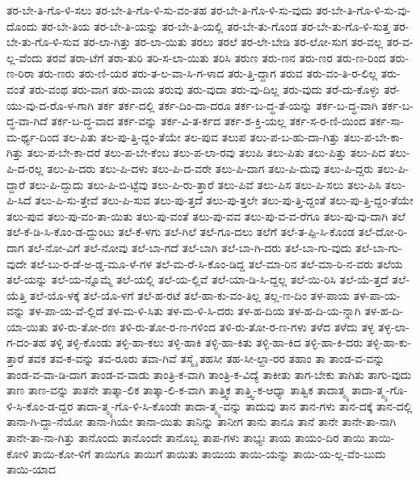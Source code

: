 {ತರ-ಬೇ-ತಿ-ಗೊ-ಳಿ-ಸಲು
ತರ-ಬೇ-ತಿ-ಗೊ-ಳಿ-ಸು-ವಂ-ತಹ
ತರ-ಬೇ-ತಿ-ಗೊ-ಳಿ-ಸು-ವುದು
ತರ-ಬೇ-ತಿ-ಗೊ-ಳಿ-ಸು-ವು-ದೊಂದು
ತರ-ಬೇ-ತಿಯ
ತರ-ಬೇ-ತಿ-ಯನ್ನು
ತರ-ಬೇ-ತಿ-ಯಲ್ಲಿ
ತರ-ಬೇ-ತು-ಗೊಂಡ
ತರ-ಬೇ-ತು-ಗೊ-ಳಿ-ಸುತ್ತ
ತರ-ಬೇ-ತು-ಗೊ-ಳಿ-ಸುವ
ತರ-ಲಾ-ಗಿತ್ತು
ತರ-ಲಾ-ಯಿತು
ತರಲು
ತರಲೆ
ತರ-ಲೇ-ಬೇಡಿ
ತರ-ಲೋ-ಸುಗ
ತರ-ವಲ್ಲ
ತರ-ವ-ಲ್ಲ-ವೆಂದು
ತರವೆ
ತರಾ-ಟೆಗೆ
ತರಾ-ತುರಿ
ತರಿ-ಸ-ಲಾ-ಯಿತು
ತರಿಸಿ
ತರುಣ
ತರು-ಣನ
ತರು-ಣರ
ತರು-ಣ-ರಿಂದ
ತರು-ಣ-ರಿರಾ
ತರು-ಣರು
ತರು-ಣಿ-ಯರ
ತರು-ತ-ಲ-ವಾ-ಸಿ-ಗ-ಳಾದ
ತರು-ತ್ತಿ-ದ್ದಾಗ
ತರುವ
ತರು-ವಂ-ತಿ-ರ-ಲಿಲ್ಲ
ತರು-ವಂತೆ
ತರು-ವಂಥ
ತರು-ವಾಗ
ತರು-ವಾಯ
ತರುವು
ತರು-ವುದಾ
ತರು-ವು-ದಿಲ್ಲ
ತರು-ವುದು
ತರೆ-ದು-ಕೊಳ್ಳು
ತರೆ-ಯು-ವು-ದ-ರೊ-ಳ-ಗಾಗಿ
ತರ್ಕ
ತರ್ಕ-ದಲ್ಲಿ
ತರ್ಕ-ದಿಂ-ದಾ-ದರೂ
ತರ್ಕ-ಬ-ದ್ಧ-ತೆ-ಯನ್ನು
ತರ್ಕ-ಬ-ದ್ಧ-ವಾಗಿ
ತರ್ಕ-ಬ-ದ್ಧ-ವಾ-ಗಿದೆ
ತರ್ಕ-ಬ-ದ್ಧ-ವಾದ
ತರ್ಕ-ವನ್ನು
ತರ್ಕ-ವಿ-ತ-ರ್ಕದ
ತರ್ಕ-ಶ-ಕ್ತಿ-ಯಲ್ಲ
ತರ್ಕ-ಸ-ರ-ಣಿ-ಯಿಂದ
ತರ್ಕ-ಸಾ-ಮ-ರ್ಥ್ಯ-ದಿಂದ
ತಲ-ಪಿತು
ತಲ-ಪು-ತ್ತಿ-ದ್ದಂ-ತೆಯೇ
ತಲ-ಪುವ
ತಲುಪ
ತಲು-ಪ-ಬ-ಹು-ದಾ-ಗಿತ್ತು
ತಲು-ಪ-ಬೇ-ಕಾ-ಗಿತ್ತು
ತಲು-ಪ-ಬೇ-ಕಾ-ದರೆ
ತಲು-ಪ-ಬೇ-ಕೆಂಬ
ತಲು-ಪ-ಲಾ-ರವು
ತಲುಪಿ
ತಲು-ಪಿತು
ತಲು-ಪಿತ್ತು
ತಲು-ಪಿದ
ತಲು-ಪಿ-ದ-ರಲ್ಲ
ತಲು-ಪಿ-ದರು
ತಲು-ಪಿ-ದಳು
ತಲು-ಪಿ-ದ-ವರೇ
ತಲು-ಪಿ-ದಾಗ
ತಲು-ಪಿ-ದುವು
ತಲು-ಪಿ-ದ್ದರು
ತಲು-ಪಿ-ದ್ದಾರೆ
ತಲು-ಪಿ-ದ್ದುದು
ತಲು-ಪಿ-ಬಿ-ಟ್ಟೆವು
ತಲು-ಪಿ-ರು-ತ್ತಾರೆ
ತಲು-ಪಿವೆ
ತಲು-ಪಿಸ
ತಲು-ಪಿ-ಸಲು
ತಲು-ಪಿಸಿ
ತಲು-ಪಿ-ಸಿದೆ
ತಲು-ಪಿ-ಸು-ತ್ತೇವೆ
ತಲು-ಪಿ-ಸುವ
ತಲು-ಪು-ತ್ತದೆ
ತಲು-ಪು-ತ್ತಲೇ
ತಲು-ಪು-ತ್ತಿ-ದ್ದಂತೆ
ತಲು-ಪು-ತ್ತಿ-ದ್ದಂ-ತೆಯೇ
ತಲು-ಪುವ
ತಲು-ಪು-ವಂ-ತಾ-ಯಿತು
ತಲು-ಪು-ವಂತೆ
ತಲು-ಪು-ವವ
ತಲು-ಪು-ವ-ವ-ರೆಗೂ
ತಲು-ಪು-ವು-ದಾಗಿ
ತಲೆ
ತಲೆ-ಕೆ-ಡಿ-ಸಿ-ಕೊಂ-ಡ-ದ್ದುಂಟು
ತಲೆ-ಕೆ-ಳಗು
ತಲೆ-ಗಿಲೆ
ತಲೆ-ಗೂ-ದಲು
ತಲೆಗೆ
ತಲೆ-ತ-ಪ್ಪಿ-ಸಿ-ಕೊಂಡ
ತಲೆ-ದೋ-ರಿ-ದಾಗ
ತಲೆ-ನೋ-ವಿಗೆ
ತಲೆ-ನೋವು
ತಲೆ-ಬಾ-ಗದೆ
ತಲೆ-ಬಾಗಿ
ತಲೆ-ಬಾ-ಗಿ-ದರು
ತಲೆ-ಬಾ-ಗು-ವುದು
ತಲೆ-ಬಾ-ಗು-ವುದೇ
ತಲೆ-ಬು-ರ-ಡೆ-ಅ-ಡ್ಡ-ಮೂ-ಳೆ-ಗಳ
ತಲೆ-ಮ-ರೆ-ಸಿ-ಕೊಂ-ಡಿದ್ದ
ತಲೆ-ಮಾ-ರಿನ
ತಲೆ-ಮಾ-ರಿ-ನ-ವರು
ತಲೆಯ
ತಲೆ-ಯನ್ನು
ತಲೆ-ಯ-ನ್ನೊಮ್ಮೆ
ತಲೆ-ಯಲ್ಲಿ
ತಲೆ-ಯ-ಲ್ಲಿವೆ
ತಲೆ-ಯಾ-ಡಿ-ಸಿ-ದ್ದಲ್ಲ
ತಲೆ-ಯಿ-ರಿಸಿ
ತಲೆ-ಯೆ-ತ್ತದೆ
ತಲೆ-ಯೆತ್ತಿ
ತಲೆ-ಯೊ-ಳಕ್ಕೆ
ತಲೆ-ಯೊ-ಳಗೆ
ತಲೆ-ಹ-ರಟೆ
ತಲೆ-ಹಾ-ಕು-ವಂ-ತಿಲ್ಲ
ತಲ್ಲ-ಣ-ದಿಂ
ತಳ-ಪಾಯ
ತಳ-ಪಾ-ಯ-ವನ್ನು
ತಳ-ಪಾ-ಯ-ವೆ-ಲ್ಲಿದೆ
ತಳ-ಮ-ಳಿ-ಸಿತು
ತಳ-ಮ-ಳಿ-ಸಿ-ದರು
ತಳ-ಹ-ದಿಯ
ತಳ-ಹ-ದಿ-ಯ-ನ್ನಾಗಿ
ತಳ-ಹ-ದಿ-ಯಾ-ಯಿತು
ತಳಿ-ರು-ತೋ-ರಣ
ತಳಿ-ರು-ತೋ-ರ-ಣ-ಗಳಿಂದ
ತಳಿ-ರು-ತೋ-ರ-ಣ-ಗಳು
ತಳೆದ
ತಳೆದು
ತಳ್ಳ
ತಳ್ಳ-ಲಾ-ಗ-ದಂ-ತಹ
ತಳ್ಳಿ
ತಳ್ಳಿ-ಕೊಂಡು
ತಳ್ಳಿ-ಹಾ-ಕಲು
ತಳ್ಳಿ-ಹಾಕಿ
ತಳ್ಳಿ-ಹಾ-ಕಿತು
ತಳ್ಳಿ-ಹಾ-ಕಿದ
ತಳ್ಳಿ-ಹಾ-ಕಿ-ದರು
ತಳ್ಳಿ-ಹಾ-ಕು-ತ್ತಾರೆ
ತವಕ
ತವ-ಕ-ವನ್ನು
ತವ-ರೂರು
ತವಾ-ಗಿವೆ
ತಸ್ಮೈ
ತಹಸೀ
ತಹ-ಸೀ-ಲ್ದಾ-ರರ
ತಹಾಂ
ತಾ
ತಾಂಡ-ವ-ವನ್ನು
ತಾಂಡ-ವ-ವಾ-ಡಿ-ದಾಗ
ತಾಂಡ-ವ-ವಾಡು
ತಾಂತ್ರಿ-ಕ-ವಾಗಿ
ತಾಂತ್ರಿ-ಕ-ವಿದ್ಯೆ
ತಾಕೀತು
ತಾಗ-ಬೇಕು
ತಾಗಿತು
ತಾಗು-ವುದು
ತಾಣ
ತಾಣ-ವನ್ನು
ತಾತನೇ
ತಾತ್ಕಾ-ಲಿಕ
ತಾತ್ಕಾ-ಲಿ-ಕ-ವಾಗಿ
ತಾತ್ತ್ವಿಕ
ತಾತ್ತ್ವಿ-ಕ-ಆಧ್ಯಾ
ತಾತ್ವಿಕ
ತಾದಾತ್ಮ್ಯ
ತಾದಾ-ತ್ಮ್ಯ-ಗೊ-ಳಿ-ಸಿ-ಕೊಂ-ಡ-ದ್ದರ
ತಾದಾ-ತ್ಮ್ಯ-ಗೊ-ಳಿ-ಸಿ-ಕೊಂಡೇ
ತಾದಾ-ತ್ಮ್ಯ-ವನ್ನು
ತಾದುವು
ತಾನ
ತಾನ-ಗಳು
ತಾನ-ದಕ್ಕೆ
ತಾನ-ದಲ್ಲಿ
ತಾನಾ-ಗಿ-ದ್ದಾ-ನೆಯೋ
ತಾನಾ-ಗಿಯೇ
ತಾನಾ-ಯಿತು
ತಾನಿನ್ನು
ತಾನೀಗ
ತಾನು
ತಾನೂ
ತಾನೆ
ತಾನೇ
ತಾನೇ-ತಾ-ನಾಗಿ
ತಾನೇ-ತಾ-ನಾ-ಗಿತ್ತು
ತಾನೊಂದು
ತಾನೊಂದೇ
ತಾನೊಬ್ಬ
ತಾಪ-ಗಳು
ತಾಭ್ಯಃ
ತಾಯ
ತಾಯಂ-ದಿರ
ತಾಯಿ
ತಾಯಿ-ಕೋಳಿ
ತಾಯಿ-ಕೋ-ಳಿಗೆ
ತಾಯಿಗೂ
ತಾಯಿಗೆ
ತಾಯಿತು
ತಾಯಿಯ
ತಾಯಿ-ಯನ್ನು
ತಾಯಿ-ಯ-ಲ್ಲ-ವೆಂ-ಬುದು
ತಾಯಿ-ಯಾದ
}

